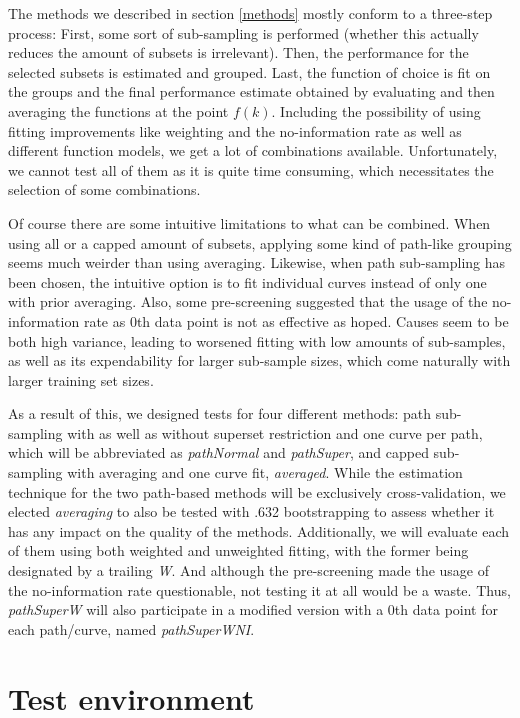 The methods we described in section \ref{methods} mostly conform to a three-step process: First, some sort of sub-sampling is performed (whether this actually reduces the amount of subsets is irrelevant). Then, the performance for the selected subsets is estimated and grouped. Last, the function of choice is fit on the groups and the final performance estimate obtained by evaluating and then averaging the functions at the point $f(k)$. Including the possibility of using fitting improvements like weighting and the no-information rate as well as different function models, we get a lot of combinations available. Unfortunately, we cannot test all of them as it is quite time consuming, which necessitates the selection of some combinations.

Of course there are some intuitive limitations to what can be combined. When using all or a capped amount of subsets, applying some kind of path-like grouping seems much weirder than using averaging. Likewise, when path sub-sampling has been chosen, the intuitive option is to fit individual curves instead of only one with prior averaging. Also, some pre-screening suggested that the usage of the no-information rate as 0th data point is not as effective as hoped. Causes seem to be both high variance, leading to worsened fitting with low amounts of sub-samples, as well as its expendability for larger sub-sample sizes, which come naturally with larger training set sizes.

As a result of this, we designed tests for four different methods: path sub-sampling with as well as without superset restriction and one curve per path, which will be abbreviated as \textit{pathNormal} and \textit{pathSuper}, and capped sub-sampling with averaging and one curve fit, \textit{averaged}. While the estimation technique for the two path-based methods will be exclusively cross-validation, we elected \textit{averaging} to also be tested with .632 bootstrapping to assess whether it has any impact on the quality of the methods. Additionally, we will evaluate each of them using both weighted and unweighted fitting, with the former being designated by a trailing \textit{W}. And although the pre-screening made the usage of the no-information rate questionable, not testing it at all would be a waste. Thus, \textit{pathSuperW} will also participate in a modified version with a 0th data point for each path/curve, named \textit{pathSuperWNI}.

\section{Test environment}

